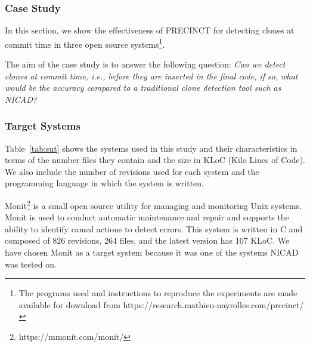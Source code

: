 \subsubsection{Case Study}
\label{sec:Experimentations}

In this section, we show the effectiveness of PRECINCT for
detecting clones at commit time in three open source systems\footnote{The programs used and instructions to reproduce the experiments are made available for download from https://research.mathieu-nayrolles.com/precinct/}.

The aim of the case study is to answer the following question: \textit{Can we detect clones at commit time, i.e., before they are inserted in the final code, if so, what would be the accuracy compared to a traditional clone detection tool such as NICAD?}

\subsubsection{Target Systems}
\label{sub:Target Systems}

Table~\ref{tab:sut} shows the systems used in this study and their characteristics in terms of the number files they contain and the size in KLoC (Kilo Lines of Code). We also include the number of revisions used for each system and the programming language in which the system is written.

\begin{table}[]
\centering
\caption{List of Target Systems in Terms of Files and Kilo Line of Code (KLOC) at current version and Language}
\label{tab:sut}
\end{table}

Monit\footnote{https://mmonit.com/monit/} is a small open source utility for managing and monitoring Unix systems.
Monit is used to conduct automatic maintenance and repair and supports the ability to identify causal actions to detect errors.
This system is written in C and composed of 826 revisions, 264 files, and the latest version has 107 KLoC.
We have chosen Monit as a target system because it was one of the systems NICAD was tested on.

